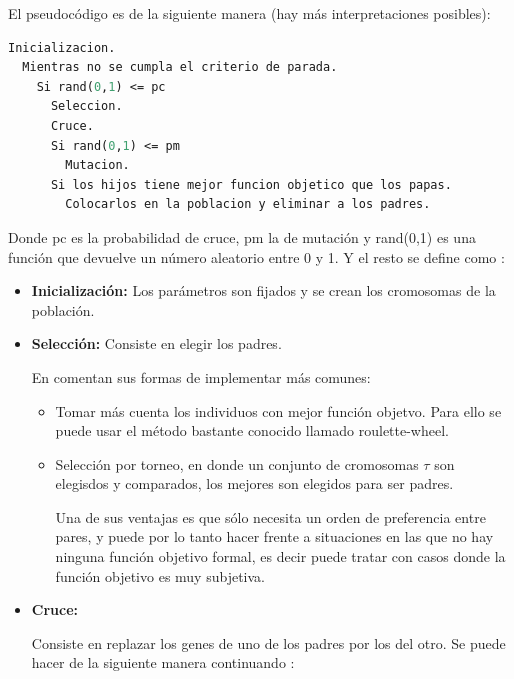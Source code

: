 El pseudoc\'odigo es de la siguiente manera (hay m\'as interpretaciones posibles):

\begin{lstlisting}[mathescape, language=Pascal]
  Inicializacion.
  Mientras no se cumpla el criterio de parada.
    Si rand(0,1) <= pc
      Seleccion.
      Cruce.
      Si rand(0,1) <= pm
        Mutacion.
      Si los hijos tiene mejor funcion objetico que los papas.
        Colocarlos en la poblacion y eliminar a los padres.
\end{lstlisting}

Donde pc es la probabilidad de cruce, pm la de mutaci\'on y rand(0,1)
es una funci\'on que devuelve un n\'umero aleatorio entre 0 y 1. Y el resto
se define como :

\begin{itemize}

\item {\bf Inicializaci\'on:} Los par\'ametros son fijados y se
crean los cromosomas de la poblaci\'on.

\item {\bf Selecci\'on:} Consiste en elegir los padres. 

En \cite{GePo2010} comentan sus formas de implementar m\'as comunes:

\begin{itemize}

\item Tomar m\'as cuenta los individuos
con mejor funci\'on objetvo. Para ello se puede usar el m\'etodo bastante conocido
llamado roulette-wheel. 

\item Selecci\'on por torneo, en
donde un conjunto de cromosomas $\tau$ son elegisdos y comparados, los mejores
son elegidos para ser padres. 

Una de sus ventajas es que s\'olo necesita un orden de preferencia entre pares,
y puede por lo tanto hacer frente a situaciones en las que no hay ninguna función objetivo formal,
es decir puede tratar con casos donde la funci\'on objetivo es muy subjetiva.

\end{itemize}

\item {\bf Cruce:}

Consiste en replazar los genes de uno de los padres por los del otro. Se puede hacer
de la siguiente manera continuando \cite{GePo2010}:

\begin{itemize}


\end{itemize}
\end{itemize}
